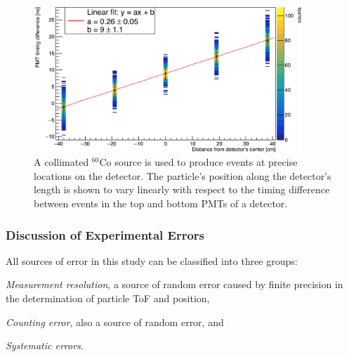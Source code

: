 \begin{figure}
    \centering
    \includegraphics[width = 0.9\textwidth]{Content/Methods/PMTDifference.png}
    \caption{A collimated $^{60}$Co source is used to produce events at precise locations on the detector.
    The particle's position along the detector's length is shown to vary linearly with respect to the timing difference between events in the top and bottom PMTs of a detector.}
    \label{fig:PMTDifference}
\end{figure}
\subsubsection{Discussion of Experimental Errors}
\label{Errors}
All sources of error in this study can be classified into three groups: \begin{enumerate*}[font={\color{red!50!black}\bfseries}]
\item \textit{Measurement resolution}, a source of random error caused by finite precision in the determination of particle ToF and position,
\item \textit{Counting error}, also a source of random error, and
\item \textit{Systematic errors}.
\end{enumerate*}


